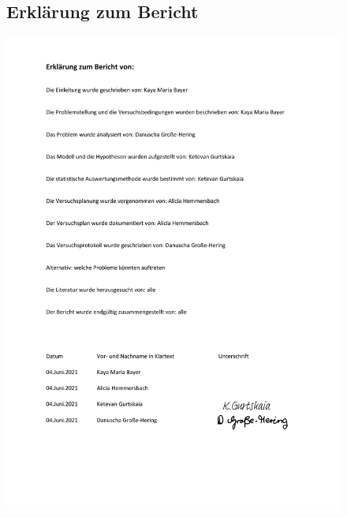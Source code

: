 \documentclass[ ngerman, fontsize= 12pt, paper=a4, headings=big, titlepage=true]{article}
\begin{document}
\begin{figure}[t]
	\subsection{Erklärung zum Bericht}
	\hspace{-2.3cm}
	\includegraphics[scale=0.8]{ErklaerungzumBericht}
\end{figure}
\end{document}
